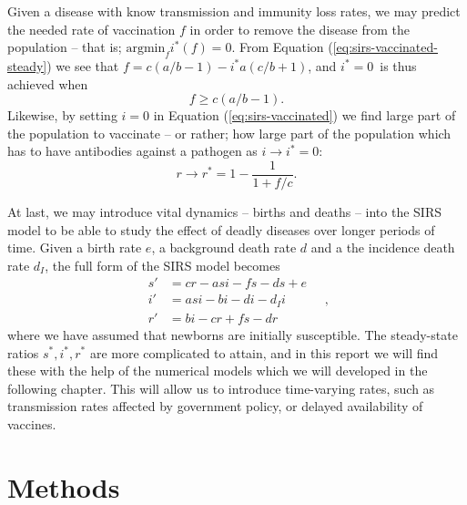 \documentclass[]{article}
\begin{document}
Given a disease with know transmission and immunity loss rates, we may predict the needed rate of vaccination $f$ in order to remove the disease from the population -- that is; $\mathrm{argmin}_{f} i^*(f) = 0$. From Equation (\ref{eq:sirs-vaccinated-steady}) we see that $f = c(a/b - 1) - i^*a(c/b + 1)$, and $i^* = 0$ is thus achieved when
\begin{equation}
	f \ge c(a/b - 1).
\end{equation}
Likewise, by setting $i = 0$ in Equation (\ref{eq:sirs-vaccinated}) we find large part of the population to vaccinate -- or rather; how large part of the population which has to have antibodies against a pathogen as $i \rightarrow i^* = 0$:
\begin{equation}
	r \rightarrow r^* = 1 - \frac{1}{1 + f/c}.
\end{equation}

At last, we may introduce vital dynamics -- births and deaths -- into the SIRS model to be able to study the effect of deadly diseases over longer periods of time. Given a birth rate $e$, a background death rate $d$ and a the incidence death rate $d_I$, the full form of the SIRS model becomes
\begin{equation} \label{eq:sirs-vitals}
\begin{aligned}
	s' &= cr - asi - fs - ds + e \\
	i' &= asi - bi - di -d_Ii\\
	r' &= bi - cr + fs - dr
\end{aligned} \quad ,
\end{equation}
where we have assumed that newborns are initially susceptible. The steady-state ratios $s^*, i^*, r^*$ are more complicated to attain, and in this report we will find these with the help of the numerical models which we will developed in the following chapter. This will allow us to introduce time-varying rates, such as transmission rates affected by government policy, or delayed availability of vaccines. 

\section{Methods} \label{sec:methods}
\end{document}
